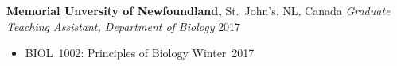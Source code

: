 
\vspace{7pt}

\textbf{Memorial Unversity of Newfoundland,} St.\ John's, NL, Canada \newline
\emph{Graduate Teaching Assistant, Department of Biology} \hfill{2017}
\begin{itemize}
  \item BIOL~1002: Principles of Biology \hfill{Winter~2017}
\end{itemize}
